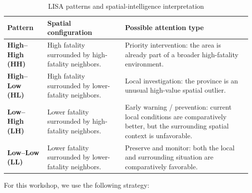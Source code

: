 \documentclass[11pt]{article}
\begin{document}
\begin{table}[!htbp]
\centering
\caption{LISA patterns and spatial-intelligence interpretation}
\label{tab:lisa_patterns}
\begin{tabularx}{\textwidth}{lXX}
\toprule
Pattern & Spatial configuration & Possible attention type \\
\midrule

\textbf{High--High (HH)} &
High fatality surrounded by high-fatality neighbors. &
Priority intervention: the area is already part of a broader high-fatality environment. \\

\textbf{High--Low (HL)} &
High fatality surrounded by lower-fatality neighbors. &
Local investigation: the province is an unusual high-value spatial outlier. \\

\textbf{Low--High (LH)} &
Lower fatality surrounded by high-fatality neighbors. &
Early warning / prevention: current local conditions are comparatively better, but the surrounding spatial context is unfavorable. \\

\textbf{Low--Low (LL)} &
Lower fatality surrounded by lower-fatality neighbors. &
Preserve and monitor: both the local and surrounding situation are comparatively favorable. \\

\bottomrule
\end{tabularx}
\end{table}

For this workshop, we use the following strategy:
\end{document}
